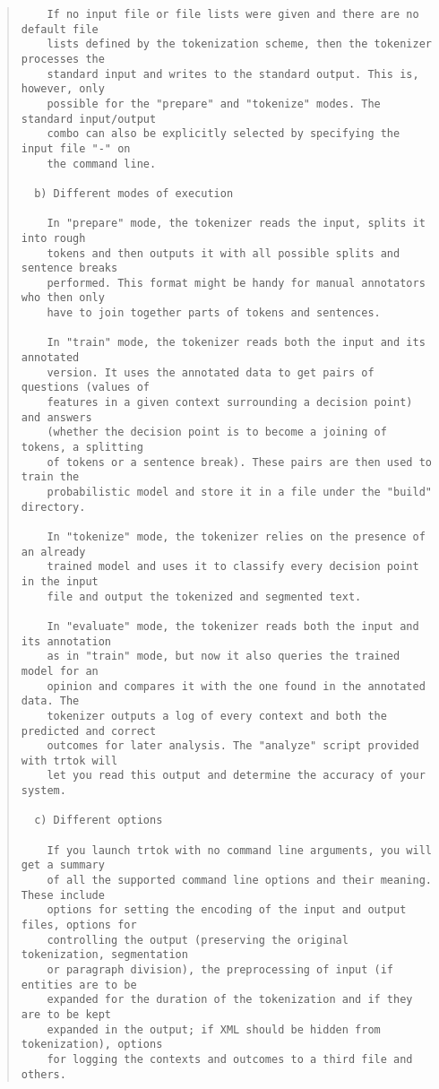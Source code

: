 \begin{scriptsize}
\begin{quote}
\begin{verbatim}
    If no input file or file lists were given and there are no default file
    lists defined by the tokenization scheme, then the tokenizer processes the
    standard input and writes to the standard output. This is, however, only
    possible for the "prepare" and "tokenize" modes. The standard input/output
    combo can also be explicitly selected by specifying the input file "-" on
    the command line.

  b) Different modes of execution

    In "prepare" mode, the tokenizer reads the input, splits it into rough
    tokens and then outputs it with all possible splits and sentence breaks
    performed. This format might be handy for manual annotators who then only
    have to join together parts of tokens and sentences.

    In "train" mode, the tokenizer reads both the input and its annotated
    version. It uses the annotated data to get pairs of questions (values of
    features in a given context surrounding a decision point) and answers
    (whether the decision point is to become a joining of tokens, a splitting
    of tokens or a sentence break). These pairs are then used to train the
    probabilistic model and store it in a file under the "build" directory.

    In "tokenize" mode, the tokenizer relies on the presence of an already
    trained model and uses it to classify every decision point in the input
    file and output the tokenized and segmented text.

    In "evaluate" mode, the tokenizer reads both the input and its annotation
    as in "train" mode, but now it also queries the trained model for an
    opinion and compares it with the one found in the annotated data. The
    tokenizer outputs a log of every context and both the predicted and correct
    outcomes for later analysis. The "analyze" script provided with trtok will
    let you read this output and determine the accuracy of your system.

  c) Different options

    If you launch trtok with no command line arguments, you will get a summary
    of all the supported command line options and their meaning. These include
    options for setting the encoding of the input and output files, options for
    controlling the output (preserving the original tokenization, segmentation
    or paragraph division), the preprocessing of input (if entities are to be
    expanded for the duration of the tokenization and if they are to be kept
    expanded in the output; if XML should be hidden from tokenization), options
    for logging the contexts and outcomes to a third file and others.
\end{verbatim}
\end{quote}
\end{scriptsize}
